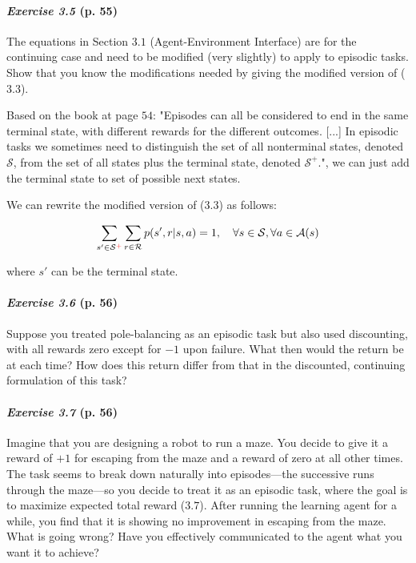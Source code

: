 \documentclass[10pt,a4paper]{article}
\begin{document}
\paragraph{\textit{Exercise 3.5} (p. 55)} The equations in Section $3.1$ (Agent-Environment Interface) are for the continuing case and need to be modified (very slightly) to apply to episodic tasks. Show that you know the modifications needed by giving the modified version of ($3.3$).

\bigskip
Based on the book at page $54$: "Episodes can all be considered to
end in the same terminal state, with different rewards for the different outcomes. [...] In episodic tasks we sometimes need
to distinguish the set of all nonterminal states, denoted $\mathcal{S}$, from the set of all states plus the terminal state, denoted $\mathcal{S}^+$.", we can just add the terminal state to set of possible next states.

We can rewrite the modified version of ($3.3$) as follows:

\begin{equation}
\sum_{s' \in \mathcal{S}^{\color{red}+\color{black}}} \sum_{r \in \mathcal{R}} p(s', r | s, a) = 1,\quad \forall s \in \mathcal{S}, \forall a \in \mathcal{A}(s)
\end{equation}

where $s'$ can be the terminal state.



\paragraph{\textit{Exercise 3.6} (p. 56)} Suppose you treated pole-balancing as an episodic task but also used discounting, with all rewards zero except for $-1$ upon failure. What then would the return be at each time? How does this return differ from that in the discounted, continuing formulation of this task?

\paragraph{\textit{Exercise 3.7} (p. 56)} Imagine that you are designing a robot to run a maze. You decide to give it a reward of $+1$ for escaping from the maze and a reward of zero at all other times. The task seems to break down naturally into episodes---the successive runs through the maze---so
you decide to treat it as an episodic task, where the goal is to maximize expected total reward ($3.7$). After running the learning agent for a while, you find that it is showing no improvement in escaping from the maze. What is going wrong? Have you effectively communicated to the agent what you want it to achieve?
\end{document}
